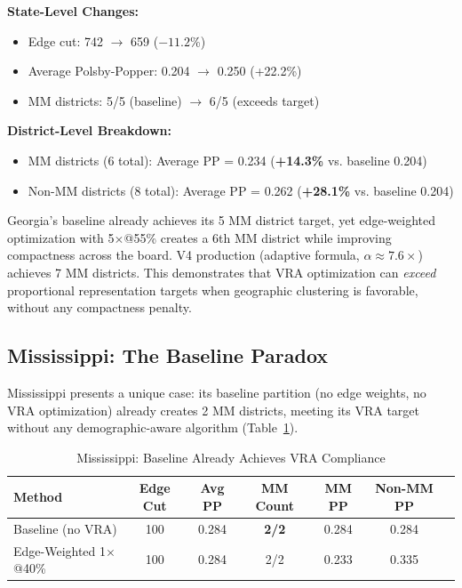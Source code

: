 \textbf{State-Level Changes:}
\begin{itemize}
    \item Edge cut: 742 $\rightarrow$ 659 ($-11.2$\%)
    \item Average Polsby-Popper: 0.204 $\rightarrow$ 0.250 (+22.2\%)
    \item MM districts: 5/5 (baseline) $\rightarrow$ 6/5 (exceeds target)
\end{itemize}

\textbf{District-Level Breakdown:}
\begin{itemize}
    \item MM districts (6 total): Average PP = 0.234 (\textbf{+14.3\%} vs. baseline 0.204)
    \item Non-MM districts (8 total): Average PP = 0.262 (\textbf{+28.1\%} vs. baseline 0.204)
\end{itemize}

Georgia's baseline already achieves its 5 MM district target, yet edge-weighted optimization with 5$\times$@55\% creates a 6th MM district while improving compactness across the board. V4 production (adaptive formula, $\alpha \approx 7.6\times$) achieves 7 MM districts. This demonstrates that VRA optimization can \emph{exceed} proportional representation targets when geographic clustering is favorable, without any compactness penalty.

\subsection{Mississippi: The Baseline Paradox}

Mississippi presents a unique case: its baseline partition (no edge weights, no VRA optimization) already creates 2 MM districts, meeting its VRA target without any demographic-aware algorithm (Table~\ref{tab:mississippi-analysis}).

\begin{table}[htbp]
\centering
\caption{Mississippi: Baseline Already Achieves VRA Compliance}
\label{tab:mississippi-analysis}
\begin{tabular}{lcccccc}
\toprule
\textbf{Method} & \textbf{Edge Cut} & \textbf{Avg PP} & \textbf{MM Count} & \textbf{MM PP} & \textbf{Non-MM PP} \\
\midrule
Baseline (no VRA) & 100 & 0.284 & \textbf{2/2} & 0.284 & 0.284 \\
Edge-Weighted 1$\times$@40\% & 100 & 0.284 & 2/2 & 0.233 & 0.335 \\
\bottomrule
\end{tabular}
\end{table}

